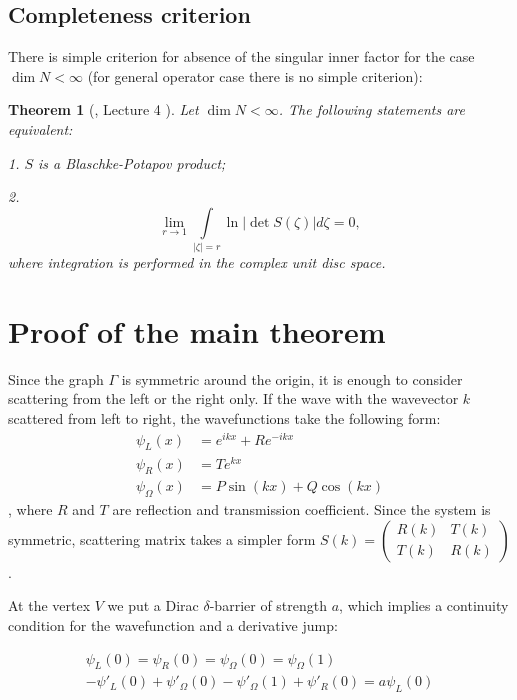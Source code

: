 \documentclass{birkjour}
\newtheorem{thm}{Theorem}[section]
\theoremstyle{definition}
\theoremstyle{remark}
\numberwithin{equation}{section}
\begin{document}
\subsection{Completeness criterion}
There is simple criterion for absence of the singular inner factor
for the case  $\dim  N < \infty$ (for general operator case there
is no simple criterion):

\begin{thm}[\cite{Nik}, Lecture 4 ] Let $\dim  N < \infty$. The following
statements are equivalent:

1.  $S$ is a Blaschke-Potapov  product;

2. \begin{equation}\label{eq:crit}\lim\limits_{r \to 1} \int\limits_{\left|\zeta\right| = r} \ln \left|\det S(\zeta)\right| d \zeta = 0,
\end{equation}
where integration is performed in the complex unit disc space.
\end{thm}

\section{Proof of the main theorem}

Since the graph $\Gamma$ is symmetric around the origin, it is enough to consider scattering from the left or the right only. If the wave with the wavevector $k$ scattered from left to right, the wavefunctions take the following form:
\begin{align*}
\psi_L(x) &= e^{i k x} + R e^{-i k x} \\
\psi_R(x) &= T e^{k x}\\
\psi_\Omega(x) &= P \sin(k x) + Q \cos(k x)
\end{align*}
, where $R$ and $T$ are reflection and transmission coefficient. Since the system is symmetric, scattering matrix takes a simpler form
$S(k) = \begin{pmatrix} R(k) & T(k) \\ T(k) & R(k) \end{pmatrix}$.

At the vertex $V$ we put a Dirac $\delta$-barrier of strength $a$, which implies a continuity condition for the wavefunction and a derivative jump:

\begin{align*}
\psi_L(0) = \psi_R(0) = \psi_\Omega(0) = \psi_\Omega(1) \\ 
-\psi'_L(0) + \psi'_\Omega(0) - \psi'_\Omega(1) + \psi'_R(0) = a \psi_L(0)
\end{align*}
\end{document}
